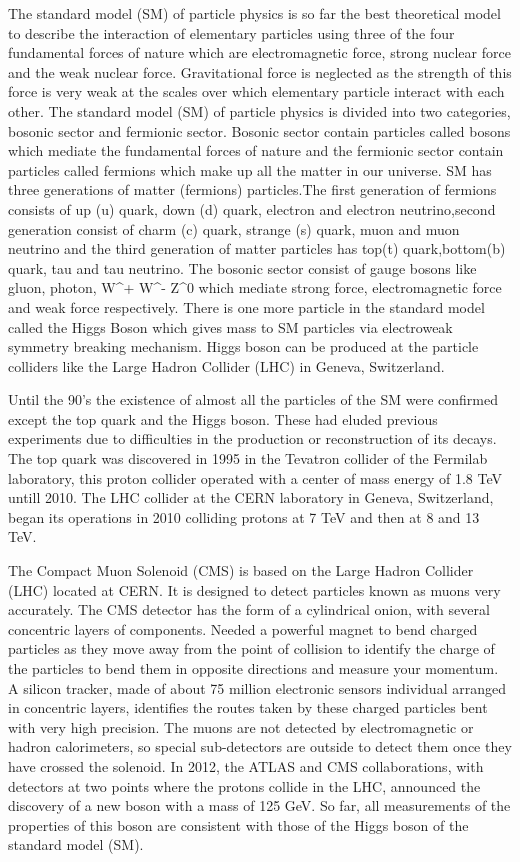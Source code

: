 \documentclass[final,3p]{CSP}
\begin{document}
The standard model (SM) of particle physics is so far the best theoretical model to describe the interaction of elementary 
particles using three of the four fundamental forces of nature which are electromagnetic force, strong nuclear force and the weak
nuclear force. Gravitational force is neglected as the strength of this force is very weak at the scales over which elementary 
particle interact with each other. The standard model (SM) of particle physics is divided into two categories, bosonic sector 
and fermionic sector. Bosonic sector contain particles called bosons which mediate the fundamental forces of nature and the
fermionic sector contain particles called fermions which make up all the matter in our universe. SM has three generations of 
matter (fermions) particles.The first generation of fermions consists of up (u) quark, down (d) quark, electron and electron 
neutrino,second generation consist of charm (c) quark, strange (s) quark, muon and muon neutrino and the third generation of matter 
particles has top(t) quark,bottom(b) quark, tau and tau neutrino. The bosonic sector consist of gauge bosons like gluon, photon, 
W^+ W^- Z^0 which mediate strong force, electromagnetic force and weak force respectively. There is one more particle in the 
standard model called the Higgs Boson which gives mass to SM particles via electroweak symmetry breaking mechanism. Higgs boson 
can be produced at the particle colliders like the Large Hadron Collider (LHC) in Geneva, Switzerland. 

Until the 90's the existence of almost all the particles of the SM were confirmed except the top quark and the Higgs boson. These had 
eluded previous experiments due to difficulties in the production or reconstruction of its decays. The top quark was discovered in 1995 
in the Tevatron collider of the Fermilab laboratory, this proton collider operated with a center of mass energy of 1.8 TeV untill 
2010. The LHC collider at the CERN laboratory in Geneva, Switzerland, began its operations in 2010 colliding protons at 7 TeV and then 
at 8 and 13 TeV.

The Compact Muon Solenoid (CMS) is based on the Large Hadron Collider (LHC) located at CERN. It is designed to detect particles known as 
muons very accurately. The CMS detector has the form of a cylindrical onion, with several concentric layers of components. Needed
a powerful magnet to bend charged particles as they move away from the point of collision to identify the charge of the particles to 
bend them in opposite directions and measure your momentum. A silicon tracker, made of about 75 million electronic sensors individual 
arranged in concentric layers, identifies the routes taken by these charged particles bent with very high precision. The muons are not 
detected by electromagnetic or hadron calorimeters, so special sub-detectors are outside to detect them once they have crossed the 
solenoid. In 2012, the ATLAS and CMS collaborations, with detectors at two points where the protons collide in the LHC, announced the 
discovery of a new boson with a mass of 125 GeV. So far, all measurements of the properties of this boson are consistent with those of 
the Higgs boson of the standard model (SM).
\end{document}
